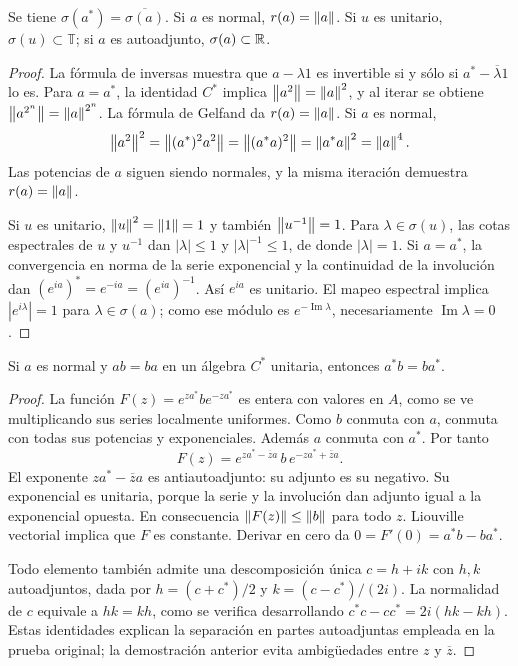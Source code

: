 \begin{proposicion}\label{v3:normal-radio-norma}
Se tiene $\sigma(a^*)=\overline{\sigma(a)}$. Si $a$ es normal, $r(a)=\left\lVert a\right\rVert$. Si $u$ es unitario, $\sigma(u)\subset\mathbb T$; si $a$ es autoadjunto, $\sigma(a)\subset\mathbb R$.
\end{proposicion}
\begin{proof}
La fórmula de inversas muestra que $a-\lambda1$ es invertible si y sólo si $a^*-\overline\lambda1$ lo es. Para $a=a^*$, la identidad $C^*$ implica $\left\lVert a^2\right\rVert=\left\lVert a\right\rVert^2$, y al iterar se obtiene $\left\lVert a^{2^n}\right\rVert=\left\lVert a\right\rVert^{2^n}$. La fórmula de Gelfand da $r(a)=\left\lVert a\right\rVert$. Si $a$ es normal,
\[
 \left\lVert a^2\right\rVert^2=\left\lVert(a^*)^2a^2\right\rVert
 =\left\lVert(a^*a)^2\right\rVert=\left\lVert a^*a\right\rVert^2=\left\lVert a\right\rVert^4.
\]
Las potencias de $a$ siguen siendo normales, y la misma iteración demuestra $r(a)=\left\lVert a\right\rVert$.

Si $u$ es unitario, $\left\lVert u\right\rVert^2=\left\lVert1\right\rVert=1$ y también $\left\lVert u^{-1}\right\rVert=1$. Para $\lambda\in\sigma(u)$, las cotas espectrales de $u$ y $u^{-1}$ dan $|\lambda|\le1$ y $|\lambda|^{-1}\le1$, de donde $|\lambda|=1$. Si $a=a^*$, la convergencia en norma de la serie exponencial y la continuidad de la involución dan $(e^{ia})^*=e^{-ia}=(e^{ia})^{-1}$. Así $e^{ia}$ es unitario. El mapeo espectral implica $|e^{i\lambda}|=1$ para $\lambda\in\sigma(a)$; como ese módulo es $e^{-\operatorname{Im}\lambda}$, necesariamente $\operatorname{Im}\lambda=0$.
\end{proof}

\begin{teorema}[Fuglede]\label{v3:fuglede}
Si $a$ es normal y $ab=ba$ en un álgebra $C^*$ unitaria, entonces $a^*b=ba^*$.
\end{teorema}
\begin{proof}
La función $F(z)=e^{za^*}be^{-za^*}$ es entera con valores en $A$, como se ve multiplicando sus series localmente uniformes. Como $b$ conmuta con $a$, conmuta con todas sus potencias y exponenciales. Además $a$ conmuta con $a^*$. Por tanto
\[
 F(z)=e^{za^*-\overline z a}\,b\,e^{-za^*+\overline z a}.
\]
El exponente $za^*-\overline z a$ es antiautoadjunto: su adjunto es su negativo. Su exponencial es unitaria, porque la serie y la involución dan adjunto igual a la exponencial opuesta. En consecuencia $\left\lVert F(z)\right\rVert\le\left\lVert b\right\rVert$ para todo $z$. Liouville vectorial implica que $F$ es constante. Derivar en cero da $0=F'(0)=a^*b-ba^*$.

Todo elemento también admite una descomposición única $c=h+ik$ con $h,k$ autoadjuntos, dada por $h=(c+c^*)/2$ y $k=(c-c^*)/(2i)$. La normalidad de $c$ equivale a $hk=kh$, como se verifica desarrollando $c^*c-cc^*=2i(hk-kh)$. Estas identidades explican la separación en partes autoadjuntas empleada en la prueba original; la demostración anterior evita ambigüedades entre $z$ y $\overline z$.
\end{proof}

